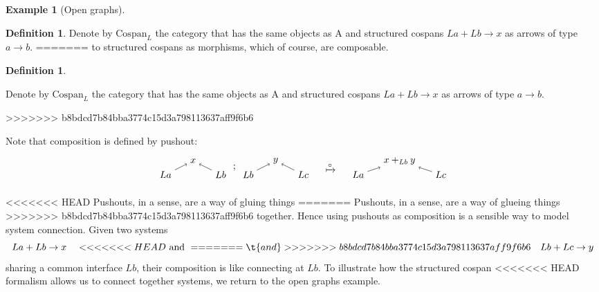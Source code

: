 \documentclass{amsart}
\newcommand{\A}{\cat{A}}
\newcommand{\Csp}{\cat{Cospan}}
\newcommand{\cat}[1]{\mathrm{#1}}
\newcommand{\csp}[3]{#1 + #3 \to #2}
\theoremstyle{remark}
\theoremstyle{definition}
\newtheorem{example}[theorem]{Example}
\newtheorem{definition}[theorem]{Definition}
\begin{document}
\begin{example}[Open graphs]
\begin{definition}
\label{def:strcsp-arr}  
  Denote by $ \Csp_{L} $ the category that has the same objects as
  $ \A $ and structured cospans $ \csp{La}{x}{Lb} $ as arrows of
  type $ a \to b $.
=======
to structured cospans as morphisms, which of course, are composable. 

\begin{definition} \label{def:strcsp-arr}
  
  Denote by $ \Csp_{L} $ the category that has the same objects as
  $ \A $ and structured cospans $ \csp{La}{x}{Lb} $ as arrows of
  type $ a \to b $.
  
>>>>>>> b8bdcd7b84bba3774c15d3a798113637aff9f6b6
\end{definition}

Note that composition is defined by pushout:
%
\[
  \begin{tikzpicture}
    \begin{scope}
    \node (1) at (0,0) {\( La \)};
    \node (2) at (1,0.5) {\( x \)};
    \node (3) at (2,0) {\( Lb \)};
    \node (4) at (3,0) {\( Lb \)};
    \node (5) at (4,0.5) {\( y \)};
    \node (6) at (5,0) {\( Lc \)};
    \node (7) at (2.5,0.25) {\( ; \)};
    \draw [->] (1) to node [] {\scriptsize{\(  \)}} (2);
    \draw [->] (3) to node [] {\scriptsize{\(  \)}} (2);
    \draw [->] (4) to node [] {\scriptsize{\(  \)}} (5);
    \draw [->] (6) to node [] {\scriptsize{\(  \)}} (5);
    \end{scope}
    \begin{scope}[shift={(6,0)}]
    \node (1) at (0,0.25) {\( \xmapsto{\circ} \)};
    \end{scope}
    \begin{scope}[shift={(7,0)}]
    \node (1) at (0,0) {\( La \)};
    \node (2) at (1.5,0.5) {\( x +_{Lb} y \)};
    \node (3) at (3,0) {\( Lc \)};
     \draw [->] (1) to node [] {\scriptsize{\(  \)}} (2);
    \draw [->] (3) to node [] {\scriptsize{\(  \)}} (2); 
    \end{scope}
  \end{tikzpicture}
\]
% 

<<<<<<< HEAD
Pushouts, in a sense, are a way of gluing things
=======
Pushouts, in a sense, are a way of glueing things
>>>>>>> b8bdcd7b84bba3774c15d3a798113637aff9f6b6
together. Hence using pushouts as composition is a sensible way to model
system connection. Given two systems
%
\[
  \csp{La}{x}{Lb}
  \quad
<<<<<<< HEAD
  \text{ and }
=======
  \t{ and }
>>>>>>> b8bdcd7b84bba3774c15d3a798113637aff9f6b6
  \quad
  \csp{Lb}{y}{Lc}
\]
% 
sharing a common interface $ Lb $, their composition is like
connecting at $ Lb $. To illustrate how the structured cospan
<<<<<<< HEAD
formalism allows us to connect together systems, we return to the open
graphs example.


\end{definition}
\end{example}
\end{document}
